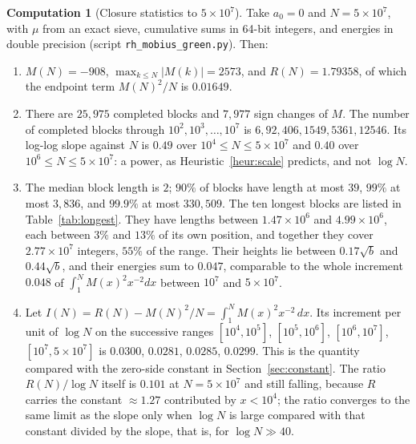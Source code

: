\documentclass[11pt]{article}
\theoremstyle{definition}
\newtheorem{computation}[theorem]{Computation}
\theoremstyle{remark}
\begin{document}
\begin{computation}[Closure statistics to $5\times10^7$]\label{comp:blocks}
Take $a_0=0$ and $N=5\times10^7$, with $\mu$ from an exact sieve, cumulative sums in 64-bit integers, and energies in double precision (script \texttt{rh\_mobius\_green.py}). Then:
\begin{enumerate}[label=(\arabic*)]
\item $M(N)=-908$, $\max_{k\le N}|M(k)|=2573$, and $R(N)=1.79358$, of which the endpoint term $M(N)^2/N$ is $0.01649$.
\item There are $25{,}975$ completed blocks and $7{,}977$ sign changes of $M$. The number of completed blocks through $10^2,10^3,\dots,10^7$ is $6,92,406,1549,5361,12546$. Its log-log slope against $N$ is $0.49$ over $10^4\le N\le5\times10^7$ and $0.40$ over $10^6\le N\le5\times10^7$: a power, as Heuristic~\ref{heur:scale} predicts, and not $\log N$.
\item The median block length is $2$; $90\%$ of blocks have length at most $39$, $99\%$ at most $3{,}836$, and $99.9\%$ at most $330{,}509$. The ten longest blocks are listed in Table~\ref{tab:longest}. They have lengths between $1.47\times10^6$ and $4.99\times10^6$, each between $3\%$ and $13\%$ of its own position, and together they cover $2.77\times10^7$ integers, $55\%$ of the range. Their heights lie between $0.17\sqrt b$ and $0.44\sqrt b$, and their energies sum to $0.047$, comparable to the whole increment $0.048$ of $\int_1^N M(x)^2x^{-2}dx$ between $10^7$ and $5\times10^7$.
\item Let $I(N)=R(N)-M(N)^2/N=\int_1^N M(x)^2x^{-2}\,dx$. Its increment per unit of $\log N$ on the successive ranges $[10^4,10^5]$, $[10^5,10^6]$, $[10^6,10^7]$, $[10^7,5\times10^7]$ is $0.0300$, $0.0281$, $0.0285$, $0.0299$. This is the quantity compared with the zero-side constant in Section~\ref{sec:constant}. The ratio $R(N)/\log N$ itself is $0.101$ at $N=5\times10^7$ and still falling, because $R$ carries the constant $\approx1.27$ contributed by $x<10^4$; the ratio converges to the same limit as the slope only when $\log N$ is large compared with that constant divided by the slope, that is, for $\log N\gg40$.
\end{enumerate}
\end{computation}
\end{document}
